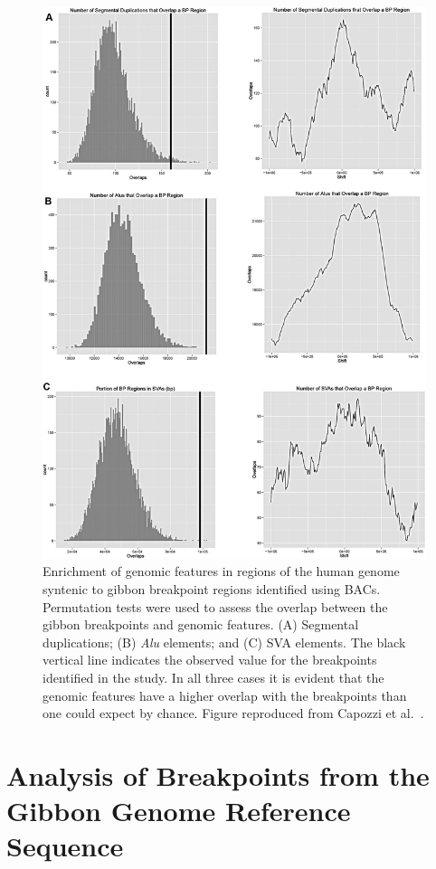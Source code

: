 \begin{figure}
\centering
\includegraphics[width=.85\textwidth]{figures/gibbon_bac_permutations.jpg}
\caption[Enrichment of genomic features in regions of the human genome syntenic to gibbon breakpoint regions identified using BACs.]{Enrichment of genomic features in regions of the human genome syntenic to gibbon breakpoint regions identified using BACs. Permutation tests were used to assess the overlap between the gibbon breakpoints and genomic features. (A) Segmental duplications; (B) \emph{Alu} elements; and (C) SVA elements. The black vertical line indicates the observed value for the breakpoints identified in the study. In all three cases it is evident that the genomic features have a higher overlap with the breakpoints than one could expect by chance. Figure reproduced from Capozzi et al.~\cite{Capozzi:2012bb}.}
\label{gibbon_bac_permutations}
\end{figure}

\section{Analysis of Breakpoints from the Gibbon Genome Reference Sequence}


